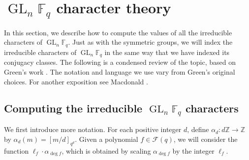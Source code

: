 \documentclass[Unicode,ALCO]{cedram}
\DeclareMathOperator{\GL}{GL}
\newcommand{\F}{\mathbb{F}}
\newcommand{\CF}{\mathcal{F}}
\newcommand{\Z}{\mathbb{Z}}
\begin{document}
\section{\texorpdfstring{\(\GL_n \F_q\)}{GLn Fq} character theory}
\label{three}





In this section, we describe how to compute the values of all the irreducible characters of $\GL_n \F_q$.
Just as with the symmetric groups, we will index the irreducible characters of \(\GL_n \F_q\) in the same way that we have indexed its conjugacy classes.
The following is a condensed review of the topic, based on Green's work \cite{green}. The notation and language we use vary from Green's original choices. For another exposition see Macdonald \cite[{Chapter~IV}]{macD}.






\subsection{Computing the irreducible \texorpdfstring{$\GL_n \F_q$}{GLn Fq} characters} \label{char_vals}



We first introduce more notation.
For each positive integer \(d\), define \(\alpha_d : d\Z \to \Z\) by \(\alpha_d (m) = [m/d]_{q^{d}}\).
Given a polynomial \(f \in \CF (q)\), we will consider the function \(\ell_f \cdot \alpha_{\deg f}\), which is obtained by scaling \(\alpha_{\deg f}\) by the integer \(\ell_f\).
\end{document}
